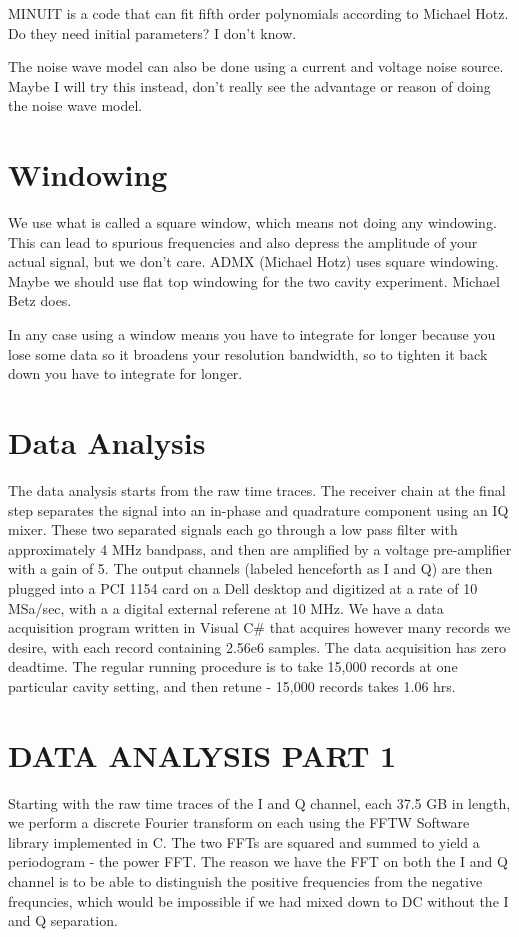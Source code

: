 \documentclass[11pt]{article}
\begin{document}
MINUIT is a code that can fit fifth order polynomials according to Michael Hotz. Do they need initial parameters? I don't know.

The noise wave model can also be done using a current and voltage noise source. Maybe I will try this instead, don't really see the advantage or reason of doing the noise wave model.


\section{Windowing}

We use what is called a square window, which means not doing any windowing. This can lead to spurious frequencies and also depress the amplitude of your actual signal, but we don't care.
ADMX (Michael Hotz) uses square windowing.
Maybe we should use flat top windowing for the two cavity experiment. Michael Betz does.

In any case using a window means you have to integrate for longer because you lose some data so it broadens your resolution bandwidth, so to tighten it back down you have to integrate for longer.

\section{Data Analysis}

The data analysis starts from the raw time traces. The receiver chain at the final step separates the signal into an in-phase and quadrature component using an IQ mixer. These two separated signals each go through a low pass filter with approximately 4 MHz bandpass, and then are amplified by a voltage pre-amplifier with a gain of 5. The output channels (labeled henceforth as I and Q) are then plugged into a PCI 1154 card on a Dell desktop and digitized at a rate of 10 MSa/sec, with a a digital external referene at 10 MHz. We have a data acquisition program written in Visual C$\#$ that acquires however many records we desire, with each record containing 2.56e6 samples. The data acquisition has zero deadtime. The regular running procedure is to take 15,000 records at one particular cavity setting, and then retune - 15,000 records takes 1.06 hrs. 

\section{DATA ANALYSIS PART 1}

Starting with the raw time traces of the I and Q channel, each 37.5 GB in length, we perform a discrete Fourier transform on each using the FFTW Software library implemented in C. The two FFTs are squared and summed to yield a periodogram - the power FFT. The reason we have the FFT on both the I and Q channel is to be able to distinguish the positive frequencies from the negative frequncies, which would be impossible if we had mixed down to DC without the I and Q separation.
\end{document}
